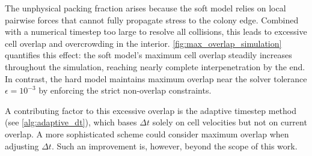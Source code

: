 \documentclass[conference]{IEEEtran}
\begin{document}
The unphysical packing fraction arises because the soft model relies on local pairwise forces that cannot fully propagate stress to the colony edge. Combined with a numerical timestep too large to resolve all collisions, this leads to excessive cell overlap and overcrowding in the interior. \autoref{fig:max_overlap_simulation} quantifies this effect: the soft model's maximum cell overlap steadily increases throughout the simulation, reaching nearly complete interpenetration by the end. In contrast, the hard model maintains maximum overlap near the solver tolerance $\epsilon = 10^{-3}$ by enforcing the strict non-overlap constraints.

A contributing factor to this excessive overlap is the adaptive timestep method (see \autoref{alg:adaptive_dt}), which bases $\Delta t$ solely on cell velocities but not on current overlap. A more sophisticated scheme could consider maximum overlap when adjusting $\Delta t$. Such an improvement is, however, beyond the scope of this work.
\end{document}
